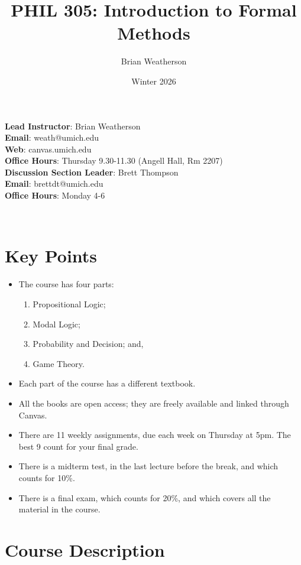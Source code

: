 \documentclass[
  letterpaper,
  DIV=11,
  numbers=noendperiod]{scrartcl}
\title{PHIL 305: Introduction to Formal Methods}
\author{Brian Weatherson}
\date{Winter 2026}
\providecommand{\tightlist}{%
  \setlength{\itemsep}{0pt}\setlength{\parskip}{0pt}}
\begin{document}
\maketitle


\textbf{Lead Instructor}: Brian Weatherson\\
\textbf{Email}: weath@umich.edu\\
\textbf{Web}: canvas.umich.edu\\
\textbf{Office Hours}: Thursday 9.30-11.30 (Angell Hall, Rm 2207)\\
\textbf{Discussion Section Leader}: Brett Thompson\\
\textbf{Email}: brettdt@umich.edu\\
\textbf{Office Hours}: Monday 4-6

~

\section{Key Points}\label{key-points}

\begin{itemize}
\tightlist
\item
  The course has four parts:

  \begin{enumerate}
  \def\labelenumi{\arabic{enumi}.}
  \tightlist
  \item
    Propositional Logic;
  \item
    Modal Logic;
  \item
    Probability and Decision; and,
  \item
    Game Theory.
  \end{enumerate}
\item
  Each part of the course has a different textbook.
\item
  All the books are open access; they are freely available and linked
  through Canvas.
\item
  There are 11 weekly assignments, due each week on Thursday at 5pm. The
  best 9 count for your final grade.
\item
  There is a midterm test, in the last lecture before the break, and
  which counts for 10\%.
\item
  There is a final exam, which counts for 20\%, and which covers all the
  material in the course.
\end{itemize}

\section{Course Description}\label{course-description}
\end{document}
